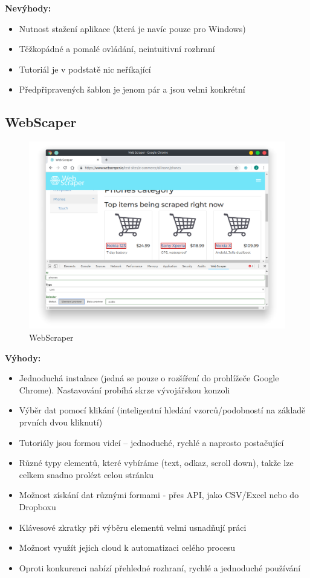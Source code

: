 \documentclass[thesis=B,czech]{FITthesis}[2012/06/26]
\begin{document}
\textbf{Nevýhody:}
\begin{itemize}
	\item Nutnost stažení aplikace (která je navíc pouze pro Windows)
	\item Těžkopádné a pomalé ovládání, neintuitivní rozhraní
	\item Tutoriál je v podstatě nic neříkající
	\item Předpřipravených šablon je jenom pár a jsou velmi konkrétní
\end{itemize}


\newpage
\subsection{WebScaper}
\begin{figure}[h]
	\includegraphics[width=\linewidth]{images/WebScraper.png}
	\caption{WebScraper}
	\label{fig:webScraper}
\end{figure}

\textbf{Výhody:}
\begin{itemize}
	\item Jednoduchá instalace (jedná se pouze o rozšíření do prohlížeče Google Chrome). Nastavování probíhá skrze vývojářskou konzoli
	\item Výběr dat pomocí klikání (inteligentní hledání vzorců/podobností na základě prvních dvou kliknutí)
	\item Tutoriály jsou formou videí -- jednoduché, rychlé a naprosto postačující
	\item Různé typy elementů, které vybíráme (text, odkaz, scroll down), takže lze celkem snadno prolézt celou stránku
	\item Možnost získání dat různými formami - přes API, jako CSV/Excel nebo do Dropboxu
	\item Klávesové zkratky při výběru elementů velmi usnad\v{n}ují práci
	\item Možnost využít jejich cloud k automatizaci celého procesu
	\item Oproti konkurenci nabízí přehledné rozhraní, rychlé a jednoduché používání
\end{itemize}
\end{document}
